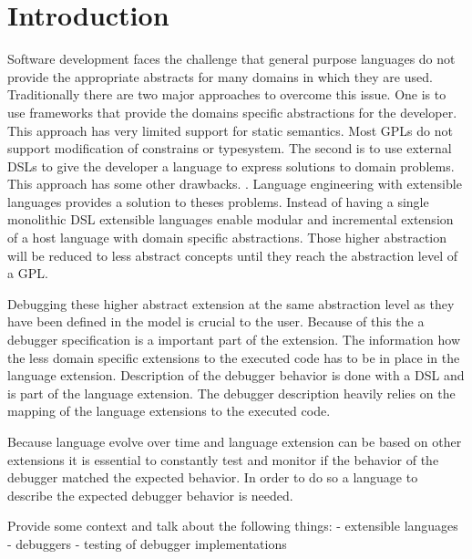 \section{Introduction}
Software development faces the challenge that general purpose languages do not provide the appropriate abstracts for many domains in which they are used. Traditionally there are two major approaches to overcome this issue. One is to use frameworks that provide the domains specific abstractions for the developer. This approach has very limited support for static semantics. Most \acp{GPL} do not support modification of constrains or typesystem. The second is to use external \acp{DSL} to give the developer a language to express solutions to domain problems. This approach has some other drawbacks. .
Language engineering with extensible languages provides a solution to theses problems. Instead of having a single monolithic \ac{DSL} extensible languages enable modular and incremental extension of a host language with domain specific abstractions. Those higher abstraction will be reduced to less abstract concepts until they reach the abstraction level of a \ac{GPL}.

Debugging these higher abstract extension at the same abstraction level as they have been defined in the model is crucial to the user. Because of this the a debugger specification is a important part of the extension. The information how the less domain specific extensions to the executed code has to be in place in the language extension. Description of the debugger behavior is done with a \ac{DSL} and is part of the language extension. The debugger description heavily relies on the mapping of the language extensions to the executed code.

Because language evolve over time and language extension can be based on other extensions it is essential to constantly test and monitor if the behavior of the debugger matched the expected behavior. In order to do so a language to describe the expected debugger behavior is needed.


 

Provide some context and talk about the following things:
- extensible languages
- debuggers 
- testing of debugger implementations
